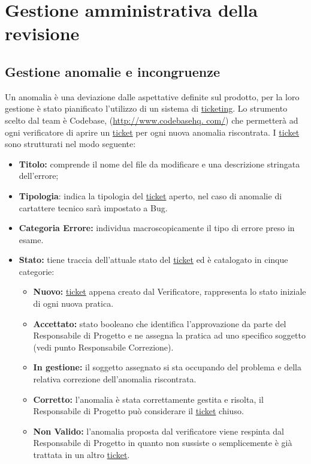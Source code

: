 \clearpage
\section{Gestione amministrativa della revisione}
\subsection{Gestione anomalie e incongruenze}
Un anomalia è una deviazione dalle aspettative definite sul prodotto, per la loro gestione è stato pianificato l'utilizzo di un sistema di \underline{ticketing}.
Lo strumento scelto dal team è Codebase, (\url{http://www.codebasehq. com/}) che permetterà ad ogni verificatore di aprire un \underline{ticket} per ogni nuova anomalia riscontrata.
I \underline{ticket} sono strutturati nel modo seguente:
\begin{itemize}
\item \textbf{Titolo:} comprende il nome del file da modificare e una descrizione stringata dell'errore;
\item \textbf{Tipologia}: indica la tipologia del \underline{ticket} aperto, nel caso di anomalie di cartattere tecnico sarà impostato a Bug.
\item \textbf{Categoria Errore:} individua macroscopicamente il tipo di errore preso in esame.
\item \textbf{Stato:} tiene traccia dell'attuale stato del \underline{ticket} ed è catalogato in cinque categorie:
\begin{itemize}
\item \textbf{Nuovo:} \underline{ticket} appena creato dal Verificatore, rappresenta lo stato iniziale di ogni nuova pratica.
\item \textbf{Accettato:} stato booleano che identifica l'approvazione da parte del Responsabile di Progetto e ne assegna la pratica ad uno specifico soggetto (vedi punto Responsabile Correzione).
\item \textbf{In gestione:} il soggetto assegnato si sta occupando del problema e della relativa correzione dell'anomalia riscontrata.
\item \textbf{Corretto:} l'anomalia è stata correttamente gestita e risolta, il Responsabile di Progetto può considerare il \underline{ticket} chiuso.
\item \textbf{Non Valido:} l'anomalia proposta dal verificatore viene respinta dal Responsabile di Progetto in quanto non sussiste o semplicemente è già trattata in un altro \underline{ticket}.
\end{itemize}

\end{itemize}
